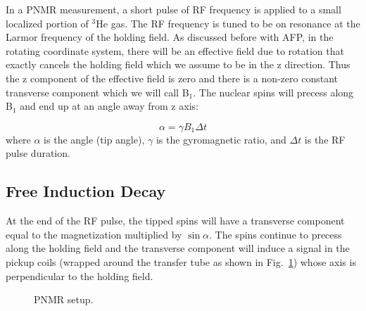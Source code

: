In a PNMR measurement, a short pulse of RF frequency is applied to a small localized portion of $^{3}$He gas. The RF frequency is tuned to be on resonance at the Larmor frequency of the holding field. As discussed before with AFP, in the rotating coordinate system, there will be an effective field due to rotation that exactly cancels the holding field which we assume to be in the z direction. Thus the z component of the effective field is zero and there is a non-zero constant transverse component which we will call B$_{1}$. The nuclear spins will precess along B$_{1}$ and end up at an angle away from z axis: 

\begin{equation}
\alpha = \gamma B_{1} \Delta t
\end{equation}
where $\alpha$ is the angle (tip angle), $\gamma$ is the gyromagnetic ratio, and $\Delta t$ is the RF pulse duration. 

\subsection{Free Induction Decay}

At the end of the RF pulse, the tipped spins will have a transverse component equal to the magnetization multiplied by $\sin{\alpha}$. The spins continue to precess along the holding field and the transverse component will induce a signal in the pickup coils (wrapped around the transfer tube as shown in Fig.~\ref{PNMR_setup}) whose axis is perpendicular to the holding field.  

\begin{figure}[t!]
	\centering
	\caption{{ PNMR setup.}}
	\label{PNMR_setup}
\end{figure}

